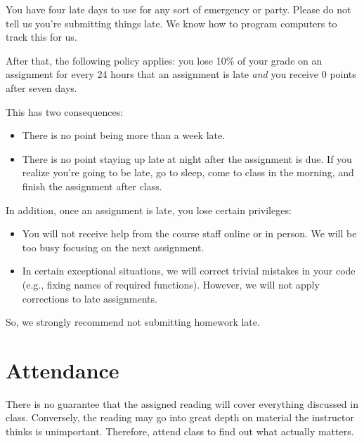 \documentclass{article}
\begin{document}
You have four late days to use for any sort of emergency or party. Please do
not tell us you're submitting things late. We know how to program computers to
track this for us.

After that, the following policy applies: you lose 10\% of your grade on an
assignment for every 24 hours that an assignment is late \emph{and} you receive
0 points after seven days.

This has two consequences:

\begin{itemize}
  
  \item There is no point being more than a week late.

  \item There is no point staying up late at night after the assignment is due.
  If you realize you’re going to be late, go to sleep, come to class in the
  morning, and finish the assignment after class.

\end{itemize}

In addition, once an assignment is late, you lose certain privileges:

\begin{itemize}

  \item You will  not receive help from the course staff online or in person.
  We will be too busy focusing on the next assignment.

  \item In certain exceptional situations, we will correct trivial mistakes in
  your code (e.g., fixing names of required functions). However, we will not
  apply corrections to late assignments.

\end{itemize}

So, we strongly recommend not submitting homework late.


\section{Attendance}

There is no guarantee that the assigned reading will cover everything discussed
in class. Conversely, the reading may go into great depth on material the
instructor thinks is unimportant. Therefore, attend class to find out what
actually matters.
\end{document}
